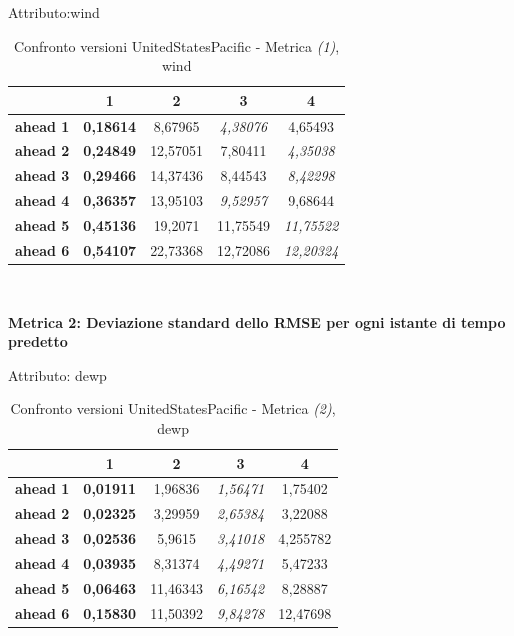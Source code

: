 \documentclass[12pt,a4paper,oneside,openright]{book}
\begin{document}
\medskip

Attributo:wind \\ 

\begin{table}[H]
\centering
\begin{tabular}{|c|c|c|c|c|}
\hline
& 1 & 2 & 3 & 4 \\
\hline
\textbf{ahead 1} & \textbf{0,18614} & 8,67965 & \textit{4,38076} & 4,65493\\
\hline
\textbf{ahead 2} & \textbf{0,24849} & 12,57051 & 7,80411 & \textit{4,35038}\\
\hline
\textbf{ahead 3} & \textbf{0,29466} & 14,37436 & 8,44543 & \textit{8,42298}\\
\hline
\textbf{ahead 4} & \textbf{0,36357} & 13,95103 & \textit{9,52957} & 9,68644\\
\hline
\textbf{ahead 5} & \textbf{0,45136} & 19,2071 & 11,75549 & \textit{11,75522}\\
\hline
\textbf{ahead 6} & \textbf{0,54107} & 22,73368 & 12,72086 & \textit{12,20324}\\
\hline
\end{tabular} \\
\caption{Confronto versioni UnitedStatesPacific - Metrica \textit{(1)}, wind}
\end{table} 


\newpage

\textbf{Metrica 2: Deviazione standard dello RMSE per ogni istante di tempo predetto} 

\medskip

Attributo: dewp \\ 

\begin{table}[H]
\centering
\begin{tabular}{|c|c|c|c|c|}
\hline
& 1 & 2 & 3 & 4 \\
\hline
\textbf{ahead 1} & \textbf{0,01911} & 1,96836 & \textit{1,56471} & 1,75402\\
\hline
\textbf{ahead 2} & \textbf{0,02325} & 3,29959 & \textit{2,65384} & 3,22088\\
\hline
\textbf{ahead 3} & \textbf{0,02536} & 5,9615 & \textit{3,41018} & 4,255782\\
\hline
\textbf{ahead 4} & \textbf{0,03935} & 8,31374 & \textit{4,49271} & 5,47233\\
\hline
\textbf{ahead 5} & \textbf{0,06463} & 11,46343 & \textit{6,16542} & 8,28887\\
\hline
\textbf{ahead 6} & \textbf{0,15830} & 11,50392 & \textit{9,84278} & 12,47698\\
\hline
\end{tabular} \\
\caption{Confronto versioni UnitedStatesPacific - Metrica \textit{(2)}, dewp}
\end{table} 
\end{document}

